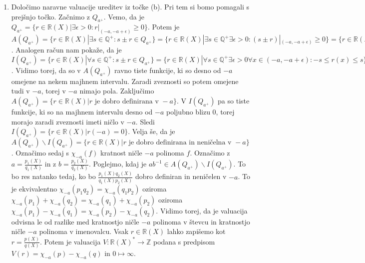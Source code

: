 \documentclass[a4paper, 12pt]{article}
\newcommand{\Z}{\mathbb{Z}}
\newcommand{\Q}{\mathbb{Q}}
\newcommand{\R}{\mathbb{R}}
\begin{document}
\begin{enumerate}
\item[(f)] Določimo naravne valuacije ureditev iz točke (b). Pri tem si bomo pomagali s prejšnjo točko. Začnimo z $Q_{a^+}$. Vemo, da je $Q_{a^+} = \{r\in \R(X)|\exists \epsilon > 0: r|_{(-a,-a+\epsilon)} \ge 0\}$. Potem je $A(Q_{a^+} ) = \{r\in \R(X)| \exists s \in \Q^+: s\pm r \in Q_{a^+}\} = \{r\in \R(X)| \exists s\in \Q^+ \exists \epsilon > 0: (s\pm r)|_{(-a,-a+\epsilon)} \ge 0\} = \{ r\in \R(X)| \exists s\in \Q^+ \exists \epsilon > 0 \forall x\in (-a,-a+\epsilon): s\pm r(x) \ge 0\} = \{ r\in \R(X)|\exists s\in \Q^+ \exists \epsilon > 0 \forall x \in (-a,-a+\epsilon): -s \le r(x) \le s\}$. Analogen račun nam pokaže, da je $I(Q_{a^+} ) = \{r\in \R(X)| \forall s\in \Q^+: s\pm r \in Q_{a^+}\} = \{r\in \R(X)| \forall s\in \Q^+ \exists \epsilon > 0 \forall x\in (-a,-a+\epsilon): -s \le r(x) \le s\}$. Vidimo torej, da so v $A(Q_{a^+})$ ravno tiste funkcije, ki so desno od $-a$ omejene na nekem majhnem intervalu. Zaradi zveznosti so potem omejene tudi v $-a$, torej v $-a$ nimajo pola. Zaključimo $A(Q_{a^+}) = \{r\in \R(X)| r \text{ je dobro definirana v } -a\}$. V $I(Q_{a^+})$ pa so tiste funkcije, ki so na majhnem intervalu desno od $-a$ poljubno blizu 0, torej morajo zaradi zveznosti imeti ničlo v $-a$. Sledi $I(Q_{a^+} ) = \{r\in \R(X)| r(-a) = 0\}$. Velja še, da je $A(Q_{a^+}) \smallsetminus I(Q_{a^+}) = \{r\in \R(X)| r \text{ je dobro definirana in neničelna v } -a\}$. Označimo sedaj s $\chi_{-a}(f)$ kratnost ničle $-a$ polinoma $f$. Označimo z $a=\frac{p_1(X)}{q_1(X)}$ in z $b = \frac{p_2(X)}{q_2(X)}$. Poglejmo, kdaj je $ab^{-1} \in A(Q_{a^+}) \smallsetminus I(Q_{a^+})$. To bo res natanko tedaj, ko bo $\frac{p_1(X)q_2(X)}{q_1(X)p_2(X)}$ dobro definiran in neničelen v $-a$. To je ekvivalentno $\chi_{-a}(p_1 q_2) = \chi_{-a}(q_1 p_2)$ oziroma $\chi_{-a}(p_1) + \chi_{-a}(q_2) = \chi_{-a}(q_1) + \chi_{-a}(p_2)$ oziroma $\chi_{-a}(p_1) - \chi_{-a}(q_1) = \chi_{-a}(p_2) - \chi_{-a}(q_2)$. Vidimo torej, da je valuacija odvisna le od razlike med kratnostjo ničle $-a$ polinoma v števcu in kratnostjo ničle $-a$ polinoma v imenovalcu. Vsak $r\in \R(X)$ lahko zapišemo kot $r = \frac{p(X)}{q(X)}$. Potem je valuacija $V:\R(X)^* \rightarrow \Z$ podana s predpisom $V(r) = \chi_{-a}(p) - \chi_{-a}(q)$ in $0 \mapsto \infty$.
 

\end{enumerate}
\end{document}
